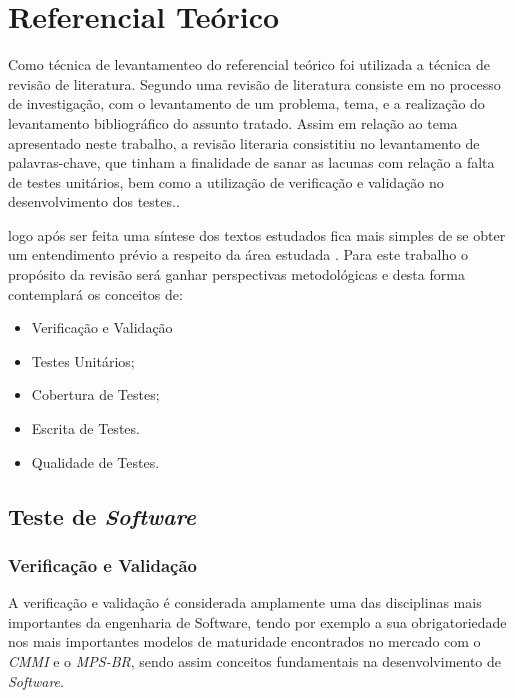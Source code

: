 \chapter{Referencial Teórico}

	Como técnica de levantamenteo do referencial teórico foi utilizada a técnica de revisão de literatura. Segundo  uma revisão de literatura consiste em no processo de investigação, com o levantamento de um problema, tema, e a realização do levantamento bibliográfico  do assunto tratado. Assim em relação ao tema apresentado neste trabalho, a revisão literaria consistitiu no levantamento de palavras-chave, que tinham a finalidade de  sanar as lacunas com relação a falta de testes unitários, bem como a utilização de verificação e validação no desenvolvimento dos testes..

    logo após ser feita uma síntese dos textos estudados fica mais simples de se obter um entendimento prévio a respeito da área estudada  .
    Para este trabalho o propósito da revisão será ganhar perspectivas metodológicas e desta forma contemplará os conceitos de:

    \begin{itemize}

        \item Verificação e Validação
        \item Testes Unitários;
        \item Cobertura de Testes;
        \item Escrita de Testes.
        \item Qualidade de Testes.
    \end{itemize}

\vfill
\pagebreak

\section{Teste de \textit{Software}}
   
\subsection{Verificação e Validação}

A verificação e validação é considerada amplamente uma das disciplinas mais importantes da engenharia de Software, tendo por exemplo a sua obrigatoriedade nos mais importantes modelos de maturidade encontrados no mercado com o \textit{CMMI} e o \textit{MPS-BR}, sendo assim conceitos fundamentais na desenvolvimento de \textit{Software}.

